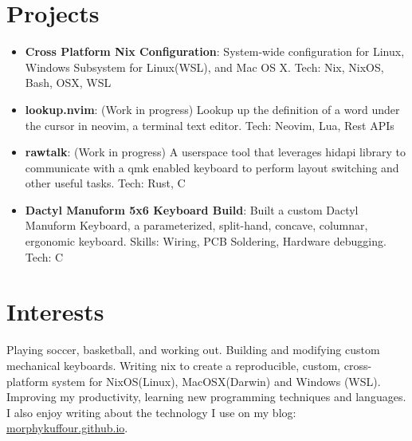 \documentclass[a4paper,20pt]{article}
\newcommand{\resumeItem}[2]{
  \item\small{
    \textbf{#1}{: #2 \vspace{-2pt}}
  }
}
\newcommand{\resumeSubItem}[2]{\resumeItem{#1}{#2}\vspace{-3pt}}
\newcommand{\resumeSubHeadingListStart}{\begin{itemize}[leftmargin=*]}
\newcommand{\resumeSubHeadingListEnd}{\end{itemize}}
\begin{document}
\section{Projects}
\vspace{5pt}
\resumeSubHeadingListStart
\resumeSubItem{Cross Platform Nix Configuration}{System-wide configuration for Linux, Windows Subsystem for Linux(WSL), and Mac OS X.  Tech: Nix, NixOS, Bash, OSX, WSL}
\vspace{2pt}
\resumeSubItem{lookup.nvim}{ (Work in progress) Lookup up the definition of a word under the cursor in neovim, a terminal text editor. Tech: Neovim, Lua, Rest APIs}
\vspace{2pt}
\resumeSubItem{rawtalk}{ (Work in progress) A userspace tool that leverages hidapi library to communicate with a qmk enabled keyboard to perform layout switching and other useful tasks. Tech: Rust, C}
\vspace{2pt}
\resumeSubItem{Dactyl Manuform 5x6 Keyboard Build}{Built a custom Dactyl Manuform Keyboard, a parameterized, split-hand, concave, columnar, ergonomic keyboard. Skills: Wiring, PCB Soldering, Hardware debugging. Tech: C}
\vspace{2pt}
\resumeSubHeadingListEnd
\vspace{-5pt}

\vspace{5pt}
\section{Interests}
\vspace{5pt}
Playing soccer, basketball, and working out. Building and modifying custom mechanical keyboards. Writing nix to create a reproducible, custom, cross-platform system for NixOS(Linux), MacOSX(Darwin) and Windows (WSL). Improving my productivity, learning new programming techniques and languages. I also enjoy writing about the technology I use on my blog: \href{https://morphykuffour.github.io/}{morphykuffour.github.io}. \\
\end{document}
